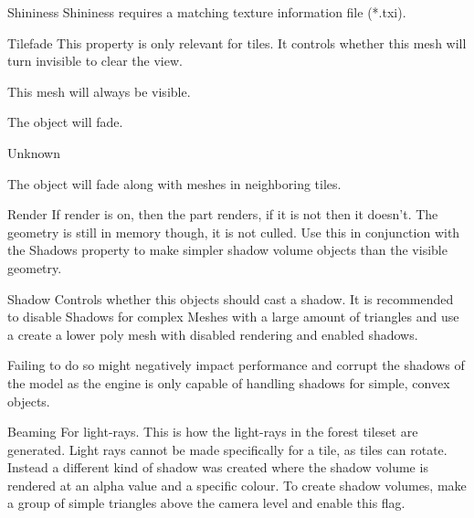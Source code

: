 \begin{propertyAurora}{Shininess}
Shininess requires a matching texture information file (*.txi).
\end{propertyAurora}

\begin{propertyAurora}{Tilefade}
This property is only relevant for tiles. It controls whether this 
mesh will turn invisible to clear the view.
\begin{description}[leftmargin=6em,style=nextline]
    \item[None] This mesh will always be visible.
    \item[Fade] The object will fade.
    \item[Base] Unknown
    \item[Neighbour] The object will fade along with meshes in neighboring tiles.
\end{description}
\end{propertyAurora}

\begin{propertyAurora}{Render}
If render is on, then the part renders, if it is not then it doesn’t. The geometry is
still in memory though, it is not culled. Use this in conjunction with the Shadows
property to make simpler shadow volume objects than the visible geometry.
\end{propertyAurora}

\begin{propertyAurora}{Shadow}
Controls whether this objects should cast a shadow. It is recommended to 
disable Shadows for complex Meshes with a large amount of triangles and 
use a create a lower poly mesh with disabled rendering and enabled shadows.

Failing to do so might negatively impact performance and corrupt the shadows of the 
model as the engine is only capable of handling shadows for simple, convex objects.
\end{propertyAurora}

\begin{propertyAurora}{Beaming}
For light-rays. This is how the light-rays in the forest tileset are generated. 
Light rays cannot be made specifically for a tile, as tiles can rotate.
Instead a different kind of shadow was created where the shadow
volume is rendered at an alpha value and a specific colour. To create shadow
volumes, make a group of simple triangles above the camera level and enable
this flag.
\end{propertyAurora}

